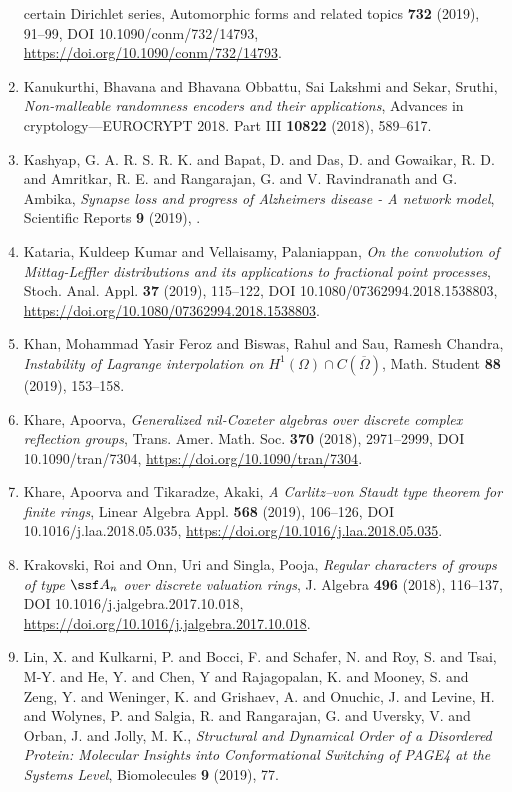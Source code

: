 \begin{enumerate}
{certain {D}irichlet series}, Automorphic forms and related topics {\bf 732} (2019), 91--99, DOI 10.1090/conm/732/14793, \url{https://doi.org/10.1090/conm/732/14793}.
\item Kanukurthi, Bhavana and Bhavana Obbattu, Sai Lakshmi and
Sekar, Sruthi, {\em Non-malleable randomness encoders and their applications}, Advances in cryptology---{EUROCRYPT} 2018. {P}art {III} {\bf 10822} (2018), 589--617.
\item Kashyap, G. A. R. S. R. K. and Bapat, D. and Das, D. and Gowaikar, R. D. and  Amritkar, R. E. and Rangarajan, G. and V. Ravindranath and G. Ambika, {\em Synapse loss and progress of Alzheimers disease - A network model}, Scientific Reports {\bf 9} (2019), .
\item Kataria, Kuldeep Kumar and Vellaisamy, Palaniappan, {\em On the convolution of {M}ittag-{L}effler distributions and its
applications to fractional point processes}, Stoch. Anal. Appl. {\bf 37} (2019), 115--122, DOI 10.1080/07362994.2018.1538803, \url{https://doi.org/10.1080/07362994.2018.1538803}.
\item Khan, Mohammad Yasir Feroz and Biswas, Rahul and Sau, Ramesh
Chandra, {\em Instability of {L}agrange interpolation on {$H^1(\Omega)\cap
C(\overline\Omega)$}}, Math. Student {\bf 88} (2019), 153--158.
\item Khare, Apoorva, {\em Generalized nil-{C}oxeter algebras over discrete complex
reflection groups}, Trans. Amer. Math. Soc. {\bf 370} (2018), 2971--2999, DOI 10.1090/tran/7304, \url{https://doi.org/10.1090/tran/7304}.
\item Khare, Apoorva and Tikaradze, Akaki, {\em A {C}arlitz--von {S}taudt type theorem for finite rings}, Linear Algebra Appl. {\bf 568} (2019), 106--126, DOI 10.1016/j.laa.2018.05.035, \url{https://doi.org/10.1016/j.laa.2018.05.035}.
\item Krakovski, Roi and Onn, Uri and Singla, Pooja, {\em Regular characters of groups of type {$\ssf A_n$} over
discrete valuation rings}, J. Algebra {\bf 496} (2018), 116--137, DOI 10.1016/j.jalgebra.2017.10.018, \url{https://doi.org/10.1016/j.jalgebra.2017.10.018}.
\item Lin, X. and Kulkarni, P. and Bocci, F. and Schafer, N. and Roy, S. and Tsai, M-Y. and He, Y. and Chen, Y and Rajagopalan, K. and Mooney, S. and Zeng, Y. and Weninger, K. and Grishaev, A. and Onuchic, J. and Levine, H. and Wolynes, P. and Salgia, R. and Rangarajan, G. and Uversky, V. and Orban, J. and Jolly, M. K., {\em Structural and Dynamical Order of a Disordered Protein: Molecular Insights into Conformational Switching of PAGE4 at the Systems Level}, Biomolecules {\bf 9} (2019), 77.

\end{enumerate}
